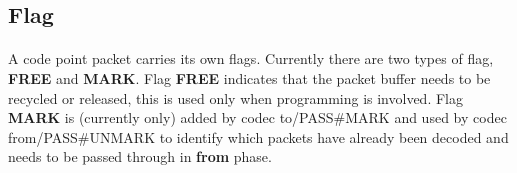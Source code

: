 \documentclass{article}
\begin{document}
		\clearpage
		
		\subsection{Flag}
			\paragraph{}
			A code point packet carries its own flags. Currently there are two types of flag, \textbf{FREE} and \textbf{MARK}. Flag \textbf{FREE} indicates that the packet buffer needs to be recycled or released, this is used only when programming is involved. Flag \textbf{MARK} is (currently only) added by codec to/PASS\#MARK and used by codec from/PASS\#UNMARK to identify which packets have already been decoded and needs to be passed through in \textbf{from} phase. 
\end{document}
